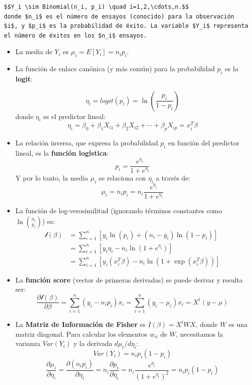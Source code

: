 \documentclass[
  letterpaper,
  DIV=11,
  numbers=noendperiod]{scrartcl}
\begin{document}
\begin{verbatim}
$$Y_i \sim Binomial(n_i, p_i) \quad i=1,2,\cdots,n.$$
donde $n_i$ es el número de ensayos (conocido) para la observación $i$, y $p_i$ es la probabilidad de éxito. La variable $Y_i$ representa el número de éxitos en los $n_i$ ensayos.
\end{verbatim}

\begin{itemize}
\item
  La media de \(Y_i\) es \(\mu_i = E[Y_i] = n_i p_i\).
\item
  La función de enlace canónica (y más común) para la probabilidad
  \(p_i\) es la \textbf{logit}:

  \[\eta_i = logit(p_i) = \ln\left(\frac{p_i}{1-p_i}\right)\] donde
  \(\eta_i\) es el predictor lineal:
  \[\eta_i = \beta_0 + \beta_1X_{i1} + \beta_2X_{i2} + \cdots + \beta_pX_{ip} = x_i^T \beta\]
\item
  La relación inversa, que expresa la probabilidad \(p_i\) en función
  del predictor lineal, es la \textbf{función logística}:
  \[p_i = \frac{e^{\eta_i}}{1+e^{\eta_i}}\] Y por lo tanto, la media
  \(\mu_i\) se relaciona con \(\eta_i\) a través de:
  \[\mu_i = n_i p_i = n_i \frac{e^{\eta_i}}{1+e^{\eta_i}}\]
\item
  La función de log-verosimilitud (ignorando términos constantes como
  \(\ln\binom{n_i}{y_i}\)) es: \[
  \begin{align*}
  \mathcal{l}(\beta) &= \sum_{i=1}^n \left[y_i\ln(p_i) + (n_i - y_i)\ln(1-p_i)\right]\\
  &= \sum_{i=1}^n \left[y_i \eta_i - n_i \ln(1+e^{\eta_i})\right] \\
  &= \sum_{i=1}^n \left[y_i (x_i^T \beta) - n_i \ln(1+\exp(x_i^T \beta))\right]
  \end{align*}
  \]
\item
  La \textbf{función score} (vector de primeras derivadas) se puede
  derivar y resulta ser:
  \[\frac{\partial \mathcal{l}(\beta)}{\partial \beta} = \sum_{i=1}^n (y_i - n_i p_i)x_i = \sum_{i=1}^n (y_i - \mu_i)x_i = X^t(y - \mu)\]
\item
  La \textbf{Matriz de Información de Fisher} es \(I(\beta) = X^tWX\),
  donde \(W\) es una matriz diagonal. Para calcular los elementos
  \(w_{ii}\) de \(W\), necesitamos la varianza \(Var(Y_i)\) y la
  derivada \(d\mu_i / d\eta_i\): \[Var(Y_i) = n_i p_i (1-p_i)\]
  \[\frac{\partial \mu_i}{\partial \eta_i} = \frac{\partial (n_i p_i)}{\partial \eta_i} = n_i \frac{\partial p_i}{\partial \eta_i} = n_i \frac{e^{\eta_i}}{(1+e^{\eta_i})^2} = n_i p_i (1-p_i)\]

\end{itemize}
\end{document}
